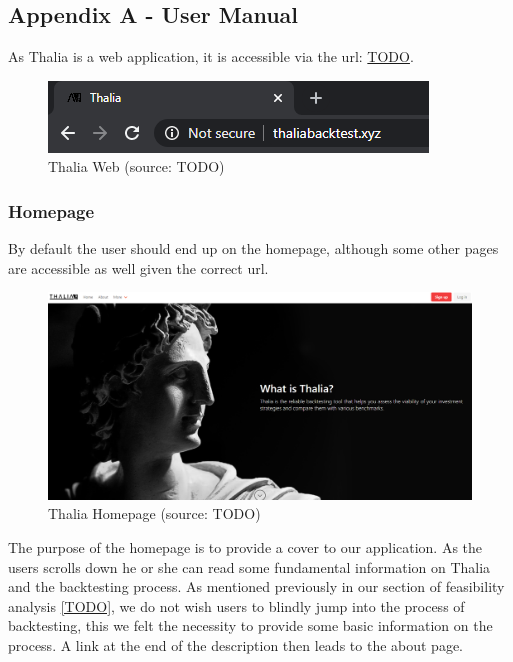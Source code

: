 \documentclass[main.tex]{subfiles}
\begin{document}
\subsection{Appendix A - User Manual}
As Thalia is a web application, it is accessible via the url: \url{TODO}. 

\begin{figure}[H]
   \centering
   \includegraphics[scale=0.6]{08Appendices/081User/081Pictures/thalia_domain.png}
   \caption{Thalia Web (source: TODO)}
   \label{thalia_web}
\end{figure}

\subsubsection{Homepage}

By default the user should end up on the homepage, although some other pages are accessible as well given the correct url. 

\begin{figure}[H]
   \centering
   \includegraphics[width=\textwidth]{08Appendices/081User/081Pictures/homepage.png}
   \caption{Thalia Homepage (source: TODO)}
   \label{thalia_home}
\end{figure}

The purpose of the homepage is to provide a cover to our application. As the users scrolls down he or she can read some fundamental information on Thalia and the backtesting process.
As mentioned previously in our section of feasibility analysis \ref{TODO}, we do not wish users to blindly jump into the process of backtesting, this we felt the necessity to provide
some basic information on the process. A link at the end of the description then leads to the about page.
\end{document}
